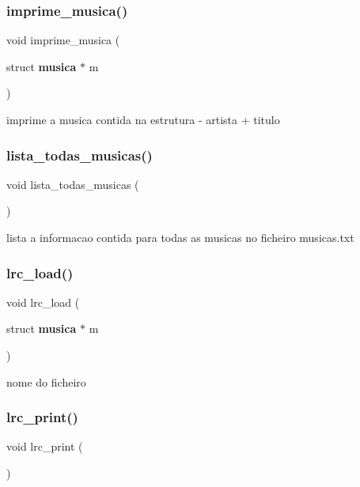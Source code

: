 \subsubsection{imprime\_musica()}
{\footnotesize\ttfamily void imprime\+\_\+musica (\begin{DoxyParamCaption}\item[{struct \textbf{ musica} $\ast$}]{m }\end{DoxyParamCaption})}

imprime a musica contida na estrutura -\/ artista + titulo \mbox{\label{project_8h_a44ba4b9e88b997f3011edeb8b9742eca}} 
\subsubsection{lista\_todas\_musicas()}
{\footnotesize\ttfamily void lista\+\_\+todas\+\_\+musicas (\begin{DoxyParamCaption}{ }\end{DoxyParamCaption})}

lista a informacao contida para todas as musicas no ficheiro musicas.\+txt \mbox{\label{project_8h_a0c43d8e1a93bdb19f97c4d8d1b214643}} 
\subsubsection{lrc\_load()}
{\footnotesize\ttfamily void lrc\+\_\+load (\begin{DoxyParamCaption}\item[{struct \textbf{ musica} $\ast$}]{m }\end{DoxyParamCaption})}



nome do ficheiro 

\mbox{\label{project_8h_a9af19c526d7c84879267f09afde85e57}} 
\subsubsection{lrc\_print()}
{\footnotesize\ttfamily void lrc\+\_\+print (\begin{DoxyParamCaption}{ }\end{DoxyParamCaption})}

